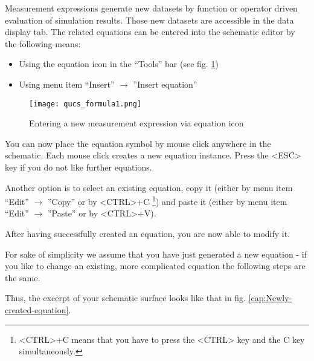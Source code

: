 \providecommand{\boldsymbol}[1]{\mbox{\boldmath $#1$}}

\providecommand{\tabularnewline}{\\}


Measurement expressions generate new datasets by function or operator
driven evaluation of simulation results. Those new datasets are accessible
in the data display tab. The related equations can be entered into
the schematic editor by the following means:

\begin{itemize}
\item Using the equation icon in the {}``Tools'' bar (see fig. \ref{cap:Entering})
\item Using menu item {}``Insert'' $\rightarrow$ ''Insert equation''
\end{itemize}
%
\begin{figure}[ht]
\begin{center}\texttt{[image: qucs\_formula1.png]}\end{center}


\caption{\label{cap:Entering}Entering a new measurement expression via equation
icon}
\end{figure}


\noindent You can now place the equation symbol by mouse click anywhere
in the schematic. Each mouse click creates a new equation instance.
Press the <ESC> key if you do not like further equations.

Another option is to select an existing equation, copy it (either
by menu item {}``Edit'' $\rightarrow$ ''Copy'' or by <CTRL>+C%
\footnote{<CTRL>+C means that you have to press the <CTRL> key and the C key
simultaneously.%
}) and paste it (either by menu item {}``Edit'' $\rightarrow$ ''Paste'' or
by <CTRL>+V).

After having successfully created an equation, you are now able to
modify it.



For sake of simplicity we assume that you have just generated a new
equation - if you like to change an existing, more complicated equation
the following steps are the same.

Thus, the excerpt of your schematic surface looks like that in fig.
\ref{cap:Newly-created-equation}.

